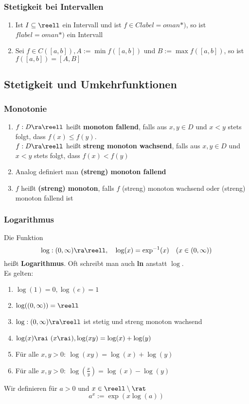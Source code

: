 \documentclass{kit}
\begin{document}
    \subsubsection{Stetigkeit bei Intervallen}
      \begin{enumerate}
        \item Ist $I\subseteq\reell$ ein Intervall und ist $f\in Clabel=
oman*)$, so ist $flabel=
oman*)$ ein Intervall
        \item Sei $f\in C([a,b]),A:=\min f([a,b])$ und $B:=\max f([a,b])$, so ist $f([a,b])=[A,B]$
      \end{enumerate}
  \subsection{Stetigkeit und Umkehrfunktionen}
    \subsubsection{Monotonie}
      \begin{enumerate}
        \item $f:D\ra\reell$ heißt \textbf{monoton fallend}, falls aus $x,y\in D$ und $x<y$ stets folgt, dass $f(x)\le f(y)$.\\
          $f:D\ra\reell$ heißt \textbf{streng monoton wachsend}, falls aus $x,y\in D$ und $x<y$ stets folgt, dass $f(x)<f(y)$
        \item Analog definiert man \textbf{(streng) monoton fallend}
        \item $f$ heißt \textbf{(streng) monoton}, falls $f$ (streng) monoton wachsend oder (streng) monoton fallend ist
      \end{enumerate}
    \subsubsection{Logarithmus}
      Die Funktion
      $$\log:(0,\infty)\ra\reell,\quad\log(x)=\exp^{-1}(x)\quad (x\in(0,\infty))$$
      heißt \textbf{Logarithmus}. Oft schreibt man auch \textbf{ln} anstatt $\log$.\\
      Es gelten:
      \begin{enumerate}
        \item $\log(1)=0,\log(e)=1$
        \item $\log((0,\infty))=\reell$
        \item $\log:(0,\infty)\ra\reell$ ist stetig und streng monoton wachsend
        \item $\log(x)\rai\ (x\rai),\log(xy)=\log(x)+\log(y)$
        \item Für alle $x,y>0:\ \log(xy)=\log(x)+\log(y)$
        \item Für alle $x,y>0:\ \log(\frac{x}{y})=\log(x)-\log(y)$
      \end{enumerate}
      Wir definieren für $a>0$ und $x\in\reell\setminus\rat$
      $$a^x:=\exp(x\log(a))$$
\end{document}
